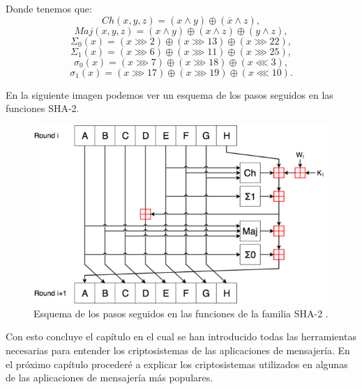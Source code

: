 Donde tenemos que:
$$
	Ch(x,y,z) = (x\wedge y)\oplus (\overline{x}\wedge z),
$$
$$
	Maj(x,y,z) = (x\wedge y)\oplus (x\wedge z)\oplus (y\wedge z),
$$
$$
	\Sigma_0(x) = (x\ggg2)\oplus (x\ggg13)\oplus (x\ggg22),
$$
$$
	\Sigma_1(x) = (x\ggg6)\oplus (x\ggg11)\oplus (x\ggg25),
$$
$$
	\sigma_0(x) = (x\ggg7)\oplus (x\ggg18)\oplus (x\lll3),
$$
$$
	\sigma_1(x) = (x\ggg17)\oplus (x\ggg19)\oplus (x\lll10).
$$

En la siguiente imagen podemos ver un esquema de los pasos seguidos en las funciones SHA-2.\\
\begin{figure}[htb]
	\centering
	\includegraphics[scale=0.5]{imagenes/sha2.png} 
	\caption{Esquema de los pasos seguidos en las funciones de la familia SHA-2 \cite{sha2wikipedia}.}
\end{figure}

Con esto concluye el capítulo en el cual se han introducido todas las herramientas necesarias para entender los criptosistemas de las aplicaciones de mensajería. En el próximo capítulo procederé a explicar los criptosistemas utilizados en algunas de las aplicaciones de mensajería más populares.
